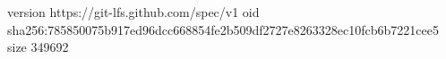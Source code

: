 version https://git-lfs.github.com/spec/v1
oid sha256:785850075b917ed96dcc668854fe2b509df2727e8263328ec10fcb6b7221cee5
size 349692
